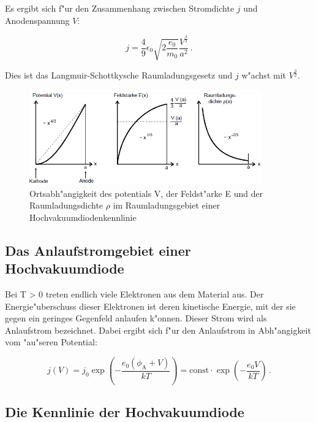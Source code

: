 Es ergibt sich f"ur den Zusammenhang zwischen Stromdichte $j$ und Anodenspannung $V$:

\begin{equation}
	j = \frac{4}{9} \epsilon_\mathrm{0} \sqrt{2 \frac{e_\mathrm{0}}{m_\mathrm{0}}} \frac{V^\frac{3}{2}}{a^2} \, .
\end{equation}

Dies ist das Langmuir-Schottkysche Raumladungsgesetz und $j$ w"achst mit $V^\frac{3}{2}$.

\begin{figure}[!h]
	\centering
	\includegraphics[width = 10cm]{img/schott.PNG}
	\caption{Ortsabh"angigkeit des potentials V, der Feldst"arke E und der Raumladungsdichte $\rho$ im Raumladungsgebiet einer Hochvakuumdiodenkennlinie}
	\label{schott}
\end{figure}

\subsection{Das Anlaufstromgebiet einer Hochvakuumdiode} %
\label{sub:das_anlaufstromgebiet_einer_hochvakuumdiode}

Bei T > 0 treten endlich viele Elektronen aus dem Material aus. Der Energie"uberschuss dieser Elektronen ist deren kinetische Energie, mit der sie gegen ein geringes Gegenfeld anlaufen k"onnen.
Dieser Strom wird als Anlaufstrom bezeichnet.
Dabei ergibt sich f"ur den Anlaufstrom in Abh"angigkeit vom "au"seren Potential:

\begin{equation}
	j(V) = j_\mathrm{0} \exp{ \left( -\frac{e_\mathrm{0} (\phi_\mathrm{A} + V)}{kT} \right)} = \mathrm{const} \cdot \exp{ \left( -\frac{e_\mathrm{0}V}{kT} \right)}\, .
\end{equation}

\subsection{Die Kennlinie der Hochvakuumdiode} %
\label{sub:die_kennlinie_der_hochvakuumdiode}

